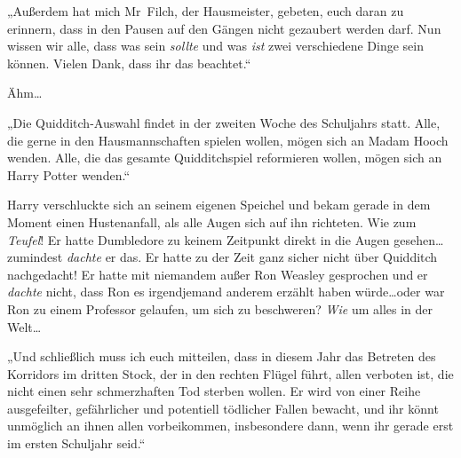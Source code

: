 „Außerdem hat mich Mr~Filch, der Hausmeister, gebeten, euch daran zu erinnern, dass in den Pausen auf den Gängen nicht gezaubert werden darf. Nun wissen wir alle, dass was sein \emph{sollte} und was \emph{ist} zwei verschiedene Dinge sein können. Vielen Dank, dass ihr das beachtet.“


Ähm…

„Die Quidditch-Auswahl findet in der zweiten Woche des Schuljahrs statt. Alle, die gerne in den Hausmannschaften spielen wollen, mögen sich an Madam Hooch wenden. Alle, die das gesamte Quidditchspiel reformieren wollen, mögen sich an Harry Potter wenden.“

Harry verschluckte sich an seinem eigenen Speichel und bekam gerade in dem Moment einen Hustenanfall, als alle Augen sich auf ihn richteten. Wie zum \emph{Teufel}! Er hatte Dumbledore zu keinem Zeitpunkt direkt in die Augen gesehen…zumindest \emph{dachte} er das. Er hatte zu der Zeit ganz sicher nicht über Quidditch nachgedacht! Er hatte mit niemandem außer Ron Weasley gesprochen und er \emph{dachte} nicht, dass Ron es irgendjemand anderem erzählt haben würde…oder war Ron zu einem Professor gelaufen, um sich zu beschweren? \emph{Wie} um alles in der Welt…

„Und schließlich muss ich euch mitteilen, dass in diesem Jahr das Betreten des Korridors im dritten Stock, der in den rechten Flügel führt, allen verboten ist, die nicht einen sehr schmerzhaften Tod sterben wollen. Er wird von einer Reihe ausgefeilter, gefährlicher und potentiell tödlicher Fallen bewacht, und ihr könnt unmöglich an ihnen allen vorbeikommen, insbesondere dann, wenn ihr gerade erst im ersten Schuljahr seid.“

